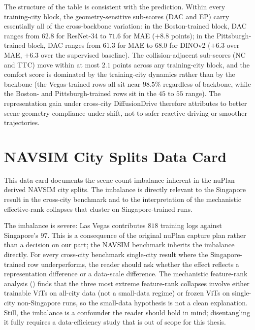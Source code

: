 The structure of the table is consistent with the prediction. Within every training-city block, the geometry-sensitive sub-scores (DAC and EP) carry essentially all of the cross-backbone variation: in the Boston-trained block, DAC ranges from $62.8$ for ResNet-34 to $71.6$ for MAE ($+8.8$ points); in the Pittsburgh-trained block, DAC ranges from $61.3$ for MAE to $68.0$ for DINOv2 ($+6.3$ over MAE, $+6.3$ over the supervised baseline). The collision-adjacent sub-scores (NC and TTC) move within at most $2.1$ points across any training-city block, and the comfort score is dominated by the training-city dynamics rather than by the backbone (the Vegas-trained rows all sit near $98.5\%$ regardless of backbone, while the Boston- and Pittsburgh-trained rows sit in the $45$ to $55$ range). The representation gain under cross-city DiffusionDrive therefore attributes to better scene-geometry compliance under shift, not to safer reactive driving or smoother trajectories.

\section{NAVSIM City Splits Data Card}
\label{app:city-data-card}

This data card documents the scene-count imbalance inherent in the nuPlan-derived NAVSIM city splits. The imbalance is directly relevant to the Singapore result in the cross-city benchmark and to the interpretation of the mechanistic effective-rank collapses that cluster on Singapore-trained runs.



The imbalance is severe: Las Vegas contributes $818$ training logs against Singapore's $97$. This is a consequence of the original nuPlan capture plan rather than a decision on our part; the NAVSIM benchmark inherits the imbalance directly. For every cross-city benchmark single-city result where the Singapore-trained row underperforms, the reader should ask whether the effect reflects a representation difference or a data-scale difference. The mechanistic feature-rank analysis () finds that the three most extreme feature-rank collapses involve either trainable ViTs on all-city data (not a small-data regime) or frozen ViTs on single-city non-Singapore runs, so the small-data hypothesis is not a clean explanation. Still, the imbalance is a confounder the reader should hold in mind; disentangling it fully requires a data-efficiency study that is out of scope for this thesis.

